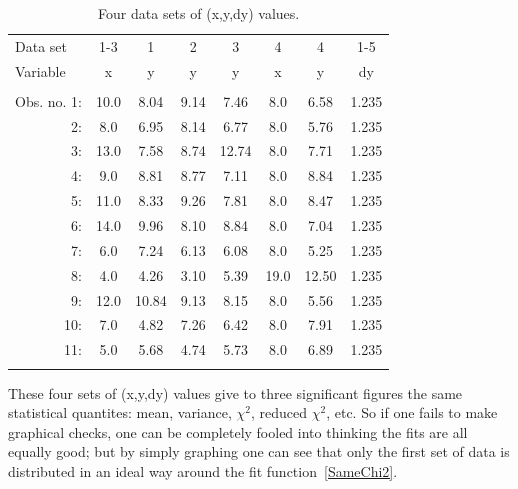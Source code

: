 \documentclass[10pt,aps,prc,twocolumn]{revtex4-1}
\begin{document}
\begin{appendix}
\begin{table}[htb]
\caption{Four data sets of (x,y,dy) values.}
\begin{tabular}{rccccccc}
\multicolumn{1}{l}{Data set}    & 1-3  & 1    & 2    & 3    & 4   & 4    & 1-5   \\
\multicolumn{1}{l}{Variable}    & x    & y    & y    & y    & x   & y    & dy    \\  
                                &      &      &      &      &     &      &       \\
Obs. no. 1: & 10.0 & 8.04 & 9.14 & 7.46 & 8.0 & 6.58 & 1.235 \\ 
         2: &  8.0 & 6.95 & 8.14 & 6.77 & 8.0 & 5.76 & 1.235 \\
         3: & 13.0 & 7.58 & 8.74 &12.74 & 8.0 & 7.71 & 1.235 \\
         4: &  9.0 & 8.81 & 8.77 & 7.11 & 8.0 & 8.84 & 1.235 \\
         5: & 11.0 & 8.33 & 9.26 & 7.81 & 8.0 & 8.47 & 1.235 \\
         6: & 14.0 & 9.96 & 8.10 & 8.84 & 8.0 & 7.04 & 1.235 \\
         7: &  6.0 & 7.24 & 6.13 & 6.08 & 8.0 & 5.25 & 1.235 \\
         8: &  4.0 & 4.26 & 3.10 & 5.39 &19.0 &12.50 & 1.235 \\
         9: & 12.0 &10.84 & 9.13 & 8.15 & 8.0 & 5.56 & 1.235 \\
        10: &  7.0 & 4.82 & 7.26 & 6.42 & 8.0 & 7.91 & 1.235 \\
        11: &  5.0 & 5.68 & 4.74 & 5.73 & 8.0 & 6.89 & 1.235 \\ 
            &      &      &      &      &     &      &       \\ \hline
\end{tabular}
\label{quartet}
\end{table}

These four sets of (x,y,dy) values give to three significant figures the
same statistical quantites: mean, variance, $\chi^2$, reduced $\chi^2$, etc.
So if one fails to make graphical checks, one can be completely fooled into thinking
the fits are all equally good; but by simply graphing one can see that only the first set 
of data is distributed in an ideal way around the fit function~\ref{SameChi2}.   


\end{appendix}
\end{document}
